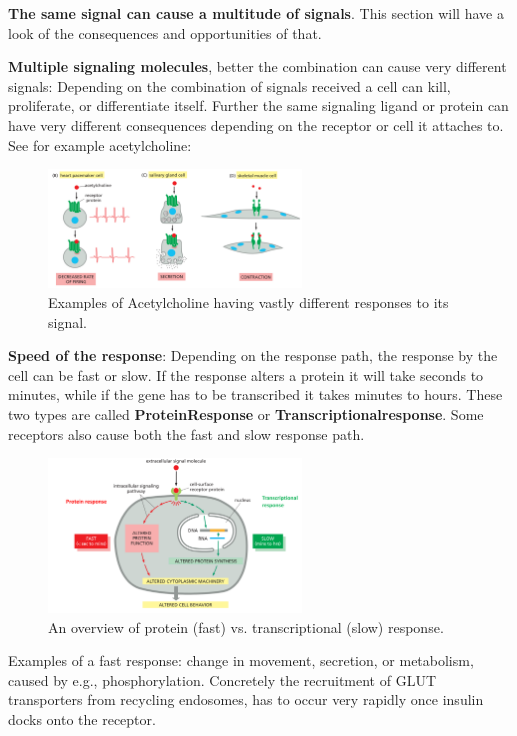 \documentclass[../main.tex]{subfiles}
\begin{document}
\textbf{The same signal can cause a multitude of signals}. This section will have a look of the consequences and opportunities of that. 

\textbf{Multiple signaling molecules}, better the combination can cause very different signals: Depending on the combination of signals received a cell can kill, proliferate, or differentiate itself. Further the same signaling ligand or protein can have very different consequences depending on the receptor or cell it attaches to. See for example acetylcholine: 

\begin{figure}[H]
	\centering
	\includegraphics[width=0.6\textwidth]{Acetylcholine}
	\caption{Examples of Acetylcholine having vastly different responses to its signal.}
\end{figure}

\textbf{Speed of the response}: Depending on the response path, the response by the cell can be fast or slow. If the response alters a protein it will take seconds to minutes, while if the gene has to be transcribed it takes minutes to hours. These two types are called \textbf{\gls{ProteinResponse}} or \textbf{\gls{Transcriptionalresponse}}. Some receptors also cause both the fast and slow response path. 

\begin{figure}[H]
	\centering
	\includegraphics[width=0.6\textwidth]{response_speed}
	\caption{An overview of protein (fast) vs. transcriptional (slow) response.}
\end{figure}

Examples of a fast response: change in movement, secretion, or metabolism, caused by e.g., phosphorylation. Concretely the recruitment of GLUT transporters from recycling endosomes, has to occur very rapidly once insulin docks onto the receptor.
\end{document}
